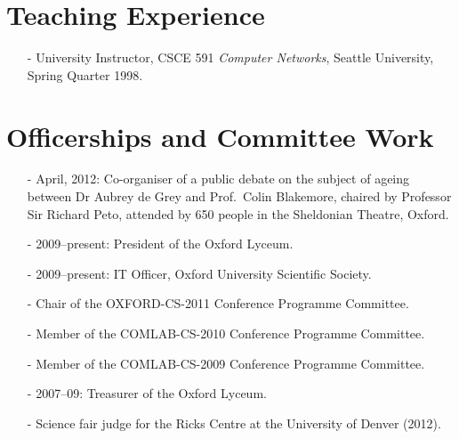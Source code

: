 \documentclass[letterpaper]{article}
\begin{document}
%
%
%
%
%

\section*{Teaching Experience} %

\begin{itemize}
    \item[-] University Instructor, CSCE 591 \emph{Computer Networks},
    Seattle University, Spring Quarter 1998.
\end{itemize}

\section*{Officerships and Committee Work}
\begin{itemize}
	\item[-] April, 2012: Co-organiser of a public debate on the subject of ageing between
		Dr Aubrey de Grey and Prof.\ Colin Blakemore, chaired by Professor Sir Richard Peto,
		attended by 650 people in the Sheldonian Theatre, Oxford.
	\item[-] 2009--present: President of the Oxford Lyceum.
	\item[-] 2009--present: IT Officer, Oxford University Scientific Society.
	\item[-] Chair of the OXFORD-CS-2011 Conference Programme Committee.
	\item[-] Member of the COMLAB-CS-2010 Conference Programme Committee.
	\item[-] Member of the COMLAB-CS-2009 Conference Programme Committee.
	\item[-] 2007--09: Treasurer of the Oxford Lyceum.
	\item[-] Science fair judge for the Ricks Centre at the University of Denver (2012).
\end{itemize}
\end{document}
